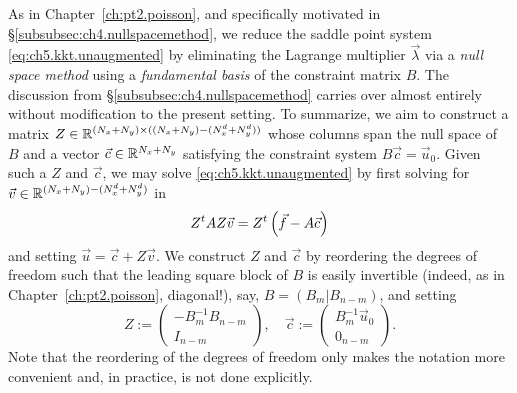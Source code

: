 As in Chapter~\ref{ch:pt2.poisson}, and specifically motivated in \S\ref{subsubsec:ch4.nullspacemethod}, we reduce the saddle point system \eqref{eq:ch5.kkt.unaugmented} by eliminating the Lagrange multiplier $\vec{\lambda}$ via a \emph{null space method} using a \emph{fundamental basis} of the constraint matrix $B$. The discussion from \S\ref{subsubsec:ch4.nullspacemethod} carries over almost entirely without modification to the present setting. To summarize, we aim to construct a matrix $Z \in \mathbb{R}^{(N_x + N_y) \times ((N_x + N_y) - (N^d_x + N^d_y))}$ whose columns span the null space of $B$ and a vector $\vec{c} \in \mathbb{R}^{N_x + N_y}$ satisfying the constraint system $B \vec{c} = \vec{u}_0$. Given such a $Z$ and $\vec{c}$, we may solve \eqref{eq:ch5.kkt.unaugmented} by first solving for $\vec{v} \in \mathbb{R}^{(N_x + N_y) - (N^d_x + N^d_y)}$ in
\begin{equation} \label{eq:ch5.ztaz}
Z^tAZ \vec{v} = Z^t \left( \vec{f} - A \vec{c} \right)
\end{equation}
and setting $\vec{u} = \vec{c} + Z \vec{v}$. We construct $Z$ and $\vec{c}$ by reordering the degrees of freedom such that the leading square block of $B$ is easily invertible (indeed, as in Chapter~\ref{ch:pt2.poisson}, diagonal!), say, $B = (B_m | B_{n-m})$, and setting
\begin{equation*} \label{eq:ch5.Zc}
Z := \begin{pmatrix} -B_m^{-1} B_{n-m} \\ I_{n-m} \end{pmatrix}, \quad \vec{c} := \begin{pmatrix} B_m^{-1} \vec{u}_0 \\ 0_{n-m} \end{pmatrix}.
\end{equation*}
Note that the reordering of the degrees of freedom only makes the notation more convenient and, in practice, is not done explicitly.

